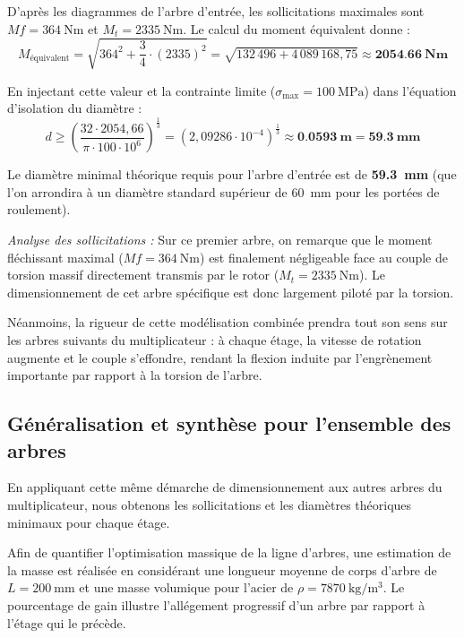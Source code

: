 \documentclass[11pt,a4paper]{article}
\begin{document}
D'après les diagrammes de l'arbre d'entrée, les sollicitations maximales sont $Mf = \qty{364}{\newton\meter}$ et $M_t = \qty{2335}{\newton\meter}$. Le calcul du moment équivalent donne :
\[ M_{\text{équivalent}} = \sqrt{364^2 + \frac{3}{4} \cdot (2335)^2} = \sqrt{132\,496 + 4\,089\,168{,}75} \approx \mathbf{\qty{2054,66}{\newton\meter}} \]

En injectant cette valeur et la contrainte limite ($\sigma_{\max} = \qty{100}{\mega\pascal}$) dans l'équation d'isolation du diamètre :
\[ d \ge \left( \frac{32 \cdot 2054{,}66}{\pi \cdot 100 \cdot 10^6} \right)^{\frac{1}{3}} = \left( 2{,}09286 \cdot 10^{-4} \right)^{\frac{1}{3}} \approx \mathbf{\qty{0,0593}{\meter}} = \mathbf{\qty{59,3}{\milli\meter}} \]

\begin{tcolorbox}[colback=BoxBg, colframe=TealAccent, arc=4pt, boxrule=1pt, title=\textbf{Conclusion du dimensionnement de l'Arbre 1}]
Le diamètre minimal théorique requis pour l'arbre d'entrée est de \textbf{\qty{59,3}{\milli\meter}} (que l'on arrondira à un diamètre standard supérieur de \qty{60}{\milli\meter} pour les portées de roulement).

\medskip
\textit{Analyse des sollicitations :} Sur ce premier arbre, on remarque que le moment fléchissant maximal ($Mf = \qty{364}{\newton\meter}$) est finalement négligeable face au couple de torsion massif directement transmis par le rotor ($M_t = \qty{2335}{\newton\meter}$). Le dimensionnement de cet arbre spécifique est donc largement piloté par la torsion. 

\medskip
Néanmoins, la rigueur de cette modélisation combinée prendra tout son sens sur les arbres suivants du multiplicateur : à chaque étage, la vitesse de rotation augmente et le couple s'effondre, rendant la flexion induite par l'engrènement importante par rapport à la torsion de l'arbre.
\end{tcolorbox}

\subsection{Généralisation et synthèse pour l'ensemble des arbres}

En appliquant cette même démarche de dimensionnement aux autres arbres du multiplicateur, nous obtenons les sollicitations et les diamètres théoriques minimaux pour chaque étage. 

Afin de quantifier l'optimisation massique de la ligne d'arbres, une estimation de la masse est réalisée en considérant une longueur moyenne de corps d'arbre de $L = \qty{200}{\milli\meter}$ et une masse volumique pour l'acier de $\rho = \qty{7870}{\kilogram\per\cubic\meter}$. Le pourcentage de gain illustre l'allégement progressif d'un arbre par rapport à l'étage qui le précède.
\end{document}
